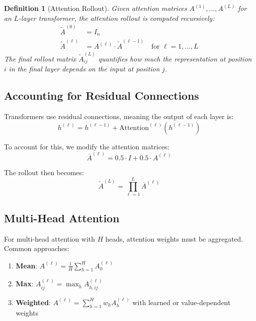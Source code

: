 \documentclass[11pt]{article}
\newtheorem{definition}[theorem]{Definition}
\begin{document}
\begin{definition}[Attention Rollout]
Given attention matrices $A^{(1)}, \ldots, A^{(L)}$ for an $L$-layer transformer, the attention rollout is computed recursively:
\begin{align}
\tilde{A}^{(0)} &= I_n \\
\tilde{A}^{(\ell)} &= A^{(\ell)} \cdot \tilde{A}^{(\ell-1)} \quad \text{for } \ell = 1, \ldots, L
\end{align}
The final rollout matrix $\tilde{A}^{(L)}_{ij}$ quantifies how much the representation at position $i$ in the final layer depends on the input at position $j$.
\end{definition}

\subsection{Accounting for Residual Connections}

Transformers use residual connections, meaning the output of each layer is:
\begin{equation}
h^{(\ell)} = h^{(\ell-1)} + \text{Attention}^{(\ell)}(h^{(\ell-1)})
\end{equation}

To account for this, we modify the attention matrices:
\begin{equation}
\bar{A}^{(\ell)} = 0.5 \cdot I + 0.5 \cdot A^{(\ell)}
\end{equation}

The rollout then becomes:
\begin{equation}
\tilde{A}^{(L)} = \prod_{\ell=1}^{L} \bar{A}^{(\ell)}
\end{equation}

\subsection{Multi-Head Attention}

For multi-head attention with $H$ heads, attention weights must be aggregated. Common approaches:
\begin{enumerate}
    \item \textbf{Mean}: $A^{(\ell)} = \frac{1}{H}\sum_{h=1}^H A^{(\ell)}_h$
    \item \textbf{Max}: $A^{(\ell)}_{ij} = \max_h A^{(\ell)}_{h,ij}$
    \item \textbf{Weighted}: $A^{(\ell)} = \sum_{h=1}^H w_h A^{(\ell)}_h$ with learned or value-dependent weights
\end{enumerate}
\end{document}
